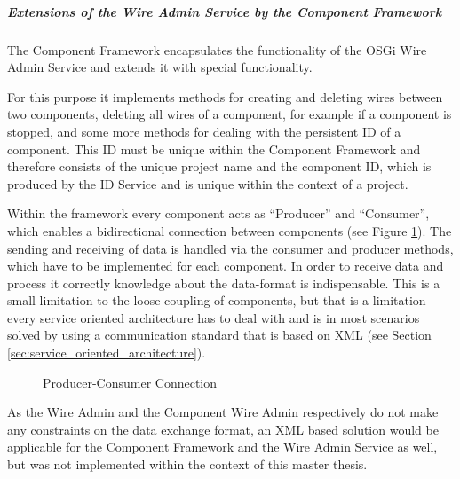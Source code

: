 \subparagraph{Extensions of the Wire Admin Service by the Component Framework}
The Component Framework encapsulates the functionality of the OSGi Wire Admin Service and extends
it with special functionality.

For this purpose it implements methods for creating and deleting wires between two components,
deleting all wires of a component, for example if a component is stopped, and some more methods for
dealing with the persistent ID of a component. This ID must be unique within the Component
Framework and therefore consists of the unique project name and the component ID, which is produced
by the ID Service and is unique within the context of a project.

Within the framework every component acts as ``Producer'' and ``Consumer'', which enables a
bidirectional connection between components (see Figure \ref{fig:component_wire_admin}). The
sending and receiving of data is handled via the consumer and producer methods, which have to be
implemented for each component. In order to receive data and process it correctly knowledge about
the data-format is indispensable. This is a small limitation to the loose coupling of components,
but that is a limitation every service oriented architecture has to deal with and is in most
scenarios solved by using a communication standard that is based on XML (see Section
\ref{sec:service_oriented_architecture}).

\begin{figure}
	\centering
	\caption{Producer-Consumer Connection}
	\label{fig:component_wire_admin}
\end{figure}

As the Wire Admin and the Component Wire Admin respectively do not make any constraints on the data
exchange format, an XML based solution would be applicable for the Component Framework and the Wire
Admin Service as well, but was not implemented within the context of this master thesis.

